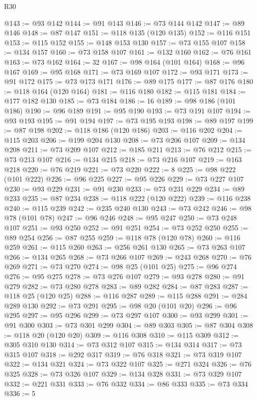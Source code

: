 \begin{lexlean}{R30}
\begin{coremodule}
{{{{{@143 := @93 @142
@144 := @91 @143
@146 := @73 @144 @142
@147 := @89 @146
@148 := @87 @147
@151 := @118 @135 (@120 @135)
@152 := @116 @151
@153 := @115 @152
@155 := @148 @153 @130
@157 := @73 @155 @107
@158 := @134 @157
@160 := @73 @158 @107
@161 := @132 @160
@162 := @76 @161
@163 := @73 @162
@164 := 32
@167 := @98 @164 (@101 @164)
@168 := @96 @167
@169 := @95 @168
@171 := @73 @169 @107
@172 := @93 @171
@173 := @91 @172
@175 := @73 @173 @171
@176 := @89 @175
@177 := @87 @176
@180 := @118 @164 (@120 @164)
@181 := @116 @180
@182 := @115 @181
@184 := @177 @182 @130
@185 := @73 @184
@186 := 16
@189 := @98 @186 (@101 @186)
@190 := @96 @189
@191 := @95 @190
@193 := @73 @191 @107
@194 := @93 @193
@195 := @91 @194
@197 := @73 @195 @193
@198 := @89 @197
@199 := @87 @198
@202 := @118 @186 (@120 @186)
@203 := @116 @202
@204 := @115 @203
@206 := @199 @204 @130
@208 := @73 @206 @107
@209 := @134 @208
@211 := @73 @209 @107
@212 := @185 @211
@213 := @76 @212
@215 := @73 @213 @107
@216 := @134 @215
@218 := @73 @216 @107
@219 := @163 @218
@220 := @76 @219
@221 := @73 @220
@222 := 8
@225 := @98 @222 (@101 @222)
@226 := @96 @225
@227 := @95 @226
@229 := @73 @227 @107
@230 := @93 @229
@231 := @91 @230
@233 := @73 @231 @229
@234 := @89 @233
@235 := @87 @234
@238 := @118 @222 (@120 @222)
@239 := @116 @238
@240 := @115 @239
@242 := @235 @240 @130
@243 := @73 @242
@246 := @98 @78 (@101 @78)
@247 := @96 @246
@248 := @95 @247
@250 := @73 @248 @107
@251 := @93 @250
@252 := @91 @251
@254 := @73 @252 @250
@255 := @89 @254
@256 := @87 @255
@259 := @118 @78 (@120 @78)
@260 := @116 @259
@261 := @115 @260
@263 := @256 @261 @130
@265 := @73 @263 @107
@266 := @134 @265
@268 := @73 @266 @107
@269 := @243 @268
@270 := @76 @269
@271 := @73 @270
@274 := @98 @25 (@101 @25)
@275 := @96 @274
@276 := @95 @275
@278 := @73 @276 @107
@279 := @93 @278
@280 := @91 @279
@282 := @73 @280 @278
@283 := @89 @282
@284 := @87 @283
@287 := @118 @25 (@120 @25)
@288 := @116 @287
@289 := @115 @288
@291 := @284 @289 @130
@292 := @73 @291
@295 := @98 @20 (@101 @20)
@296 := @96 @295
@297 := @95 @296
@299 := @73 @297 @107
@300 := @93 @299
@301 := @91 @300
@303 := @73 @301 @299
@304 := @89 @303
@305 := @87 @304
@308 := @118 @20 (@120 @20)
@309 := @116 @308
@310 := @115 @309
@312 := @305 @310 @130
@314 := @73 @312 @107
@315 := @134 @314
@317 := @73 @315 @107
@318 := @292 @317
@319 := @76 @318
@321 := @73 @319 @107
@322 := @134 @321
@324 := @73 @322 @107
@325 := @271 @324
@326 := @76 @325
@328 := @73 @326 @107
@329 := @134 @328
@331 := @73 @329 @107
@332 := @221 @331
@333 := @76 @332
@334 := @86 @333
@335 := @73 @334
@336 := 5
}}}}}
\end{coremodule}
\end{lexlean}
